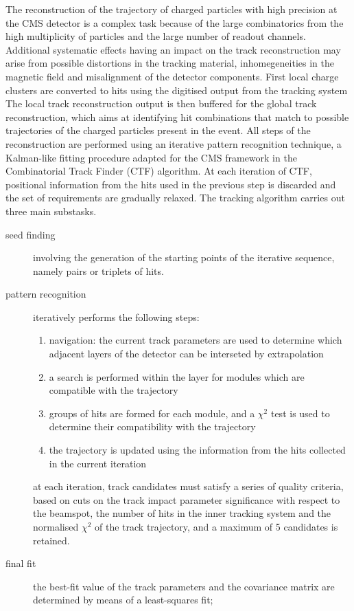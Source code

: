 The reconstruction of the trajectory of charged particles with high precision at the CMS detector
is a complex task because of the large combinatorics from the high multiplicity of particles and the large number of readout channels.
Additional systematic effects having an impact on the track reconstruction may arise from possible distortions in the tracking
material, inhomegeneities in the magnetic field and misalignment of the detector components.
First local charge clusters are converted to hits using the digitised output from the tracking system
The local track reconstruction output is then buffered for the global track reconstruction, which aims at identifying
hit combinations that match to possible trajectories of the charged particles present in the event.
All steps of the reconstruction are performed using an iterative pattern recognition technique, a Kalman-like fitting procedure adapted for the CMS framework in the Combinatorial Track Finder \cite{billoir.qian:simultaneous} (CTF) algorithm.
At each iteration of CTF, positional information from the hits used in the previous step is discarded and the set of requirements are gradually relaxed.
The tracking algorithm carries out three main substasks.
\begin{description}
\item[seed finding] involving the generation of the starting points of the iterative sequence, namely pairs or triplets of hits.
\item[pattern recognition] iteratively performs the following steps:
  \begin{enumerate}
  \item navigation: the current track parameters are used to determine which adjacent layers of the detector can be interseted by extrapolation
  \item a search is performed within the layer for modules which are compatible with the trajectory
  \item groups of hits are formed for each module, and a $\chi^2$ test is used to determine their compatibility with the trajectory
  \item the trajectory is updated using the information from the hits collected in the current iteration
  \end{enumerate}
  at each iteration, track candidates must satisfy a series of quality criteria, based on cuts on the track impact parameter significance with respect to the beamspot, the number of hits in the inner tracking system and the normalised $\chi^2$ of the track trajectory, and a maximum of 5 candidates is retained.
\item[final fit] the best-fit value of the track parameters and the covariance matrix are determined by means of a least-squares fit;
\end{description}

